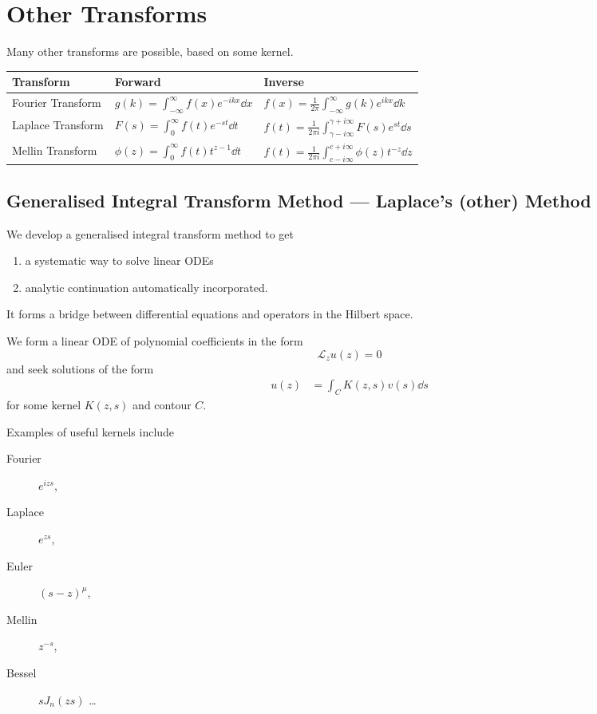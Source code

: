 \documentclass[a4paper,12pt,parskip=full,BCOR=1cm]{scrreprt}
\begin{document}
\chapter{Other Transforms}
Many other transforms are possible, based on some kernel.
\begin{center}
 \begin{tabular}{lll}\toprule
  Transform         & Forward                                          & Inverse                                                                       \\\midrule
  Fourier Transform & $g(k)=\int_{-\infty}^{\infty}f(x)e^{-ikx}\dd{x}$ & $f(x)=\frac{1}{2\pi}\int_{-\infty}^{\infty}g(k)e^{ikx}\dd{k}$                 \\
  Laplace Transform & $F(s)=\int_0^\infty f(t)e^{-st}\dd{t}$           & $f(t)=\frac{1}{2\pi i}\int_{\gamma-i\infty}^{\gamma+i\infty}F(s)e^{st}\dd{s}$ \\
  Mellin Transform  & $\phi(z)=\int_0^\infty f(t)t^{z-1}\dd{t}$        & $f(t) = \frac{1}{2\pi i}\int_{c-i\infty}^{c+i\infty}\phi(z)t^{-z}\dd{z}$      \\\bottomrule
 \end{tabular}
\end{center}

\section{Generalised Integral Transform Method --- Laplace's (other) Method}
We develop a generalised integral transform method to get
\begin{enumerate}
 \item a systematic way to solve linear ODEs
 \item analytic continuation automatically incorporated.
\end{enumerate}
It forms a bridge between differential equations and operators in the Hilbert space.

We form a linear ODE of polynomial coefficients in the form
\begin{equation*}
 \mathcal{L}_z u(z) = 0
\end{equation*} and seek solutions of the form
\begin{align*}
 u(z) & = \int_C K(z,s) v(s) \dd{s}
\end{align*} for some kernel $K(z,s)$ and contour $C$.

Examples of useful kernels include
\begin{description}
 \item [Fourier] $e^{izs}$,
 \item [Laplace] $e^{zs}$,
 \item [Euler] $(s-z)^\mu$,
 \item [Mellin] $z^{-s}$,
 \item [Bessel] $sJ_n(zs)$ \ldots
\end{description}
\end{document}
